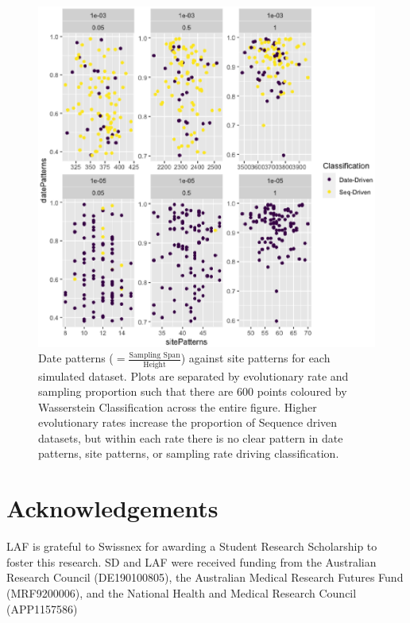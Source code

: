 \documentclass{article}
\begin{document}
\begin{figure}[H]
\centering
\includegraphics[width=1\linewidth]{../figures/patternsClass.eps}
\caption{Date patterns ($=\frac{\text{Sampling Span}}{\text{Height}}$) against site patterns for each simulated dataset. Plots are separated by evolutionary rate and sampling proportion such that there are 600 points coloured by Wasserstein Classification across the entire figure. Higher evolutionary rates increase the proportion of Sequence driven datasets, but within each rate there is no clear pattern in date patterns, site patterns, or sampling rate driving classification.}
\label{fig:patterns}
\end{figure}

\section*{Acknowledgements}
LAF is grateful to Swissnex for awarding a Student Research Scholarship to foster this research. SD and LAF were received funding from the Australian Research Council (DE190100805), the Australian Medical Research Futures Fund (MRF9200006), and the National Health and Medical Research Council (APP1157586)
%
\end{document}
